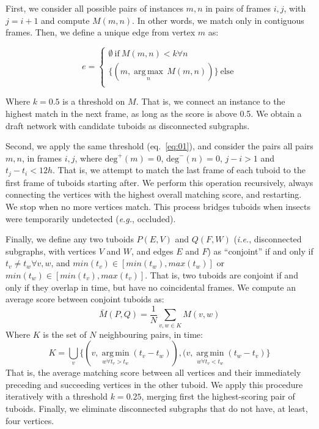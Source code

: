 \documentclass[12pt]{article}
\begin{document}
\begin{linenumbers}
		First, we consider all possible pairs of instances $m, n$ in pairs of frames $i, j$, with $j=i+1$ and compute $M(m,n)$. In other words, we match only in contiguous frames. Then, we define a unique edge from vertex $m$ as:
		
		\begin{equation}
			\label{eq:01}
			e = \begin{cases}
				\emptyset~\text{if}~M(m,n)<k \forall n \\
				\{(m, \underset{n}{\operatorname{arg\,max}}\,M(m,n))\}~\text{else} \\
			\end{cases}
		\end{equation}
		
		Where $k=0.5$ is a threshold on $M$. That is, we connect an instance to the highest match in the next frame, as long as the score is above 0.5. We obtain a draft network with candidate tuboids as disconnected subgraphs.
		
		
		Second, we apply the same threshold (eq.~\ref{eq:01}), and consider the pairs all pairs $m, n$, in frames $i,j$, where $\text{deg}^+(m) = 0$, $\text{deg}^-(n) = 0$, $j - i > 1$ and $t_j - t_i < 12h$. That is, we attempt to match the last frame of each tuboid to the first frame of tuboids starting after. We perform this operation recursively, always connecting the vertices with the highest overall matching score, and restarting. We stop when no more vertices match. This process bridges tuboids when insects were temporarily undetected (\emph{e.g.}, occluded).
		
		Finally, we define any two tuboids $P(E, V)$ and $Q(F, W)$ (\emph{i.e.}, disconnected subgraphs, with vertices $V$ and $W$, and edges $E$ and $F$) as “conjoint” if and only if $t_{v} \neq t_{w} \forall v,w$, and $min(t_v) \in [min(t_w), max(t_w)]$ or $min(t_w) \in [min(t_v), max(t_v)]$. That is, two tuboids are conjoint if and only if they overlap in time, but have no coincidental frames. We compute an average score between conjoint tuboids as:
		$$
		\bar{M}(P, Q) = \frac{1}{N}\sum_{v,w \in K}^{}M(v,w)
		$$
		Where $K$ is the set of $N$ neighbouring pairs, in time: 
		$$
		K = \bigcup_{v} \{(v,  \underset{w \forall t_v > t_w}{\operatorname{arg\,min}}(t_v - t_w)), (v,\underset{w \forall t_v < t_w}{\operatorname{arg\,min}}(t_w - t_v)\}
		$$
		That is, the average matching score between all vertices and their immediately preceding and succeeding vertices in the other tuboid. We apply this procedure iteratively with a threshold $k=0.25$, merging first the highest-scoring pair of tuboids. Finally, we eliminate disconnected subgraphs that do not have, at least, four vertices.
		

\end{linenumbers}
\end{document}
